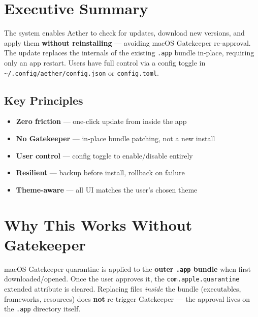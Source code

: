 \documentclass[11pt, a4paper]{article}
\newcommand{\inlinecode}[1]{\texttt{\small\colorbox{codebg}{#1}}}
\begin{document}
\newpage

\thispagestyle{empty}
\tableofcontents
\newpage

\setcounter{page}{1}

\section{Executive Summary}
\label{sec:executive-summary}

The system enables Aether to check for updates, download new versions, and apply them \textbf{without reinstalling} --- avoiding macOS Gatekeeper re-approval. The update replaces the internals of the existing \texttt{.app} bundle in-place, requiring only an app restart. Users have full control via a config toggle in \inlinecode{\textasciitilde/.config/aether/config.json} or \inlinecode{config.toml}.

\subsection{Key Principles}

\begin{itemize}[nosep, leftmargin=*]
  \item \textbf{Zero friction} --- one-click update from inside the app
  \item \textbf{No Gatekeeper} --- in-place bundle patching, not a new install
  \item \textbf{User control} --- config toggle to enable/disable entirely
  \item \textbf{Resilient} --- backup before install, rollback on failure
  \item \textbf{Theme-aware} --- all UI matches the user's chosen theme
\end{itemize}


\section{Why This Works Without Gatekeeper}
\label{sec:gatekeeper}

macOS Gatekeeper quarantine is applied to the \textbf{outer \texttt{.app} bundle} when first downloaded/opened. Once the user approves it, the \texttt{com.apple.quarantine} extended attribute is cleared. Replacing files \textit{inside} the bundle (executables, frameworks, resources) does \textbf{not} re-trigger Gatekeeper --- the approval lives on the \texttt{.app} directory itself.
\end{document}
